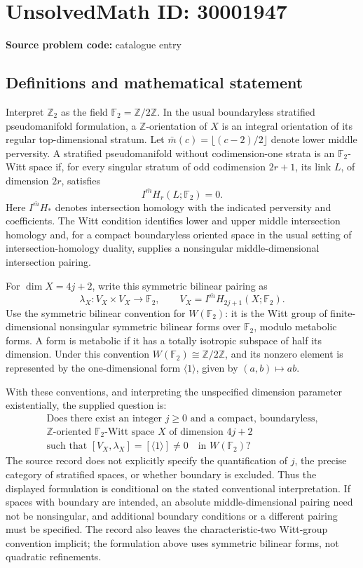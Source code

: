 \documentclass[11pt]{article}
\newcommand{\F}{\mathbb{F}}
\begin{document}
\section*{UnsolvedMath ID: 30001947}
\textbf{Source problem code:} catalogue entry
\subsection{Definitions and mathematical statement}
Interpret \(\mathbb Z_2\) as the field \(\F_2=\mathbb Z/2\mathbb Z\). In the usual boundaryless stratified pseudomanifold formulation, a \(\mathbb Z\)-orientation of \(X\) is an integral orientation of its regular top-dimensional stratum. Let \(\bar m(c)=\lfloor(c-2)/2\rfloor\) denote lower middle perversity. A stratified pseudomanifold without codimension-one strata is an \(\F_2\)-Witt space if, for every singular stratum of odd codimension \(2r+1\), its link \(L\), of dimension \(2r\), satisfies
\[
I^{\bar m}H_r(L;\F_2)=0.
\]
Here \(I^{\bar m}H_*\) denotes intersection homology with the indicated perversity and coefficients. The Witt condition identifies lower and upper middle intersection homology and, for a compact boundaryless oriented space in the usual setting of intersection-homology duality, supplies a nonsingular middle-dimensional intersection pairing.

For \(\dim X=4j+2\), write this symmetric bilinear pairing as
\[
\lambda_X:V_X\times V_X\longrightarrow\F_2,
\qquad V_X=I^{\bar m}H_{2j+1}(X;\F_2).
\]
Use the symmetric bilinear convention for \(W(\F_2)\): it is the Witt group of finite-dimensional nonsingular symmetric bilinear forms over \(\F_2\), modulo metabolic forms. A form is metabolic if it has a totally isotropic subspace of half its dimension. Under this convention \(W(\F_2)\cong\mathbb Z/2\mathbb Z\), and its nonzero element is represented by the one-dimensional form \(\langle1\rangle\), given by \((a,b)\mapsto ab\).

With these conventions, and interpreting the unspecified dimension parameter existentially, the supplied question is:
\[
\begin{gathered}
\text{Does there exist an integer }j\geq0\text{ and a compact, boundaryless,}\\
\mathbb Z\text{-oriented }\F_2\text{-Witt space }X\text{ of dimension }4j+2\\
\text{such that }[V_X,\lambda_X]=[\langle1\rangle]\neq0
\quad\text{in }W(\F_2)?
\end{gathered}
\]
The source record does not explicitly specify the quantification of \(j\), the precise category of stratified spaces, or whether boundary is excluded. Thus the displayed formulation is conditional on the stated conventional interpretation. If spaces with boundary are intended, an absolute middle-dimensional pairing need not be nonsingular, and additional boundary conditions or a different pairing must be specified. The record also leaves the characteristic-two Witt-group convention implicit; the formulation above uses symmetric bilinear forms, not quadratic refinements.
\end{document}
